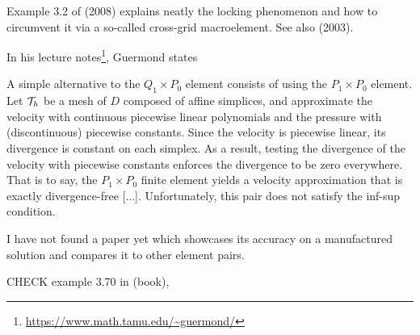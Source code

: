Example 3.2 of \textcite{bobf08} (2008) explains neatly the locking phenomenon and how 
to circumvent it via a so-called cross-grid macroelement. See also 
\textcite{hokl03} (2003).

In his lecture notes\footnote{\url{https://www.math.tamu.edu/~guermond/}}, 
Guermond states 
\begin{displayquote}
{\color{darkgray}
A simple alternative to the 
$Q_1\times P_0$ element consists of using the $P_1\times P_0$ element.
Let ${\cal T}_h$  be a mesh of $D$ composed of affine simplices, and approximate the 
velocity with continuous piecewise linear polynomials and the pressure with
(discontinuous) piecewise constants. Since the velocity is piecewise linear, its
divergence is constant on each simplex. As a result, testing the divergence
of the velocity with piecewise constants enforces the divergence to be zero
everywhere. That is to say, the $P_1\times P_0$ finite element yields a velocity 
approximation that is exactly divergence-free [...]. Unfortunately,
this pair does not satisfy the inf-sup condition.}
\end{displayquote}

I have not found a paper yet which showcases its accuracy on a manufactured solution
and compares it to other element pairs.


CHECK example 3.70 in \textcite{john16} (book),
